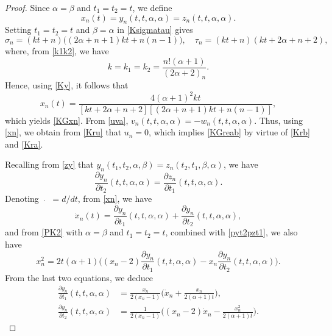 \documentclass[10pt, reqno]{amsart}
\numberwithin{equation}{section}
\numberwithin{equation}{section}
\begin{document}
\begin{proof}
Since $\alpha=\beta$ and $t_1=t_2=t$, we define
\begin{equation}
x_n(t)=y_n(t,t,\alpha,\alpha)=z_n(t,t,\alpha,\alpha).\label{xn}
\end{equation}
Setting $t_1=t_2=t$ and $\beta=\alpha $ in \eqref{Ksigmatau} gives
\begin{equation*}
\sigma_n=(kt+n)\big((2\alpha+n+1)kt+n(n-1)\big),\quad \tau_n=(kt+n)(kt+2\alpha+n+2),
\end{equation*}
where, from \eqref{k1k2}, we have
\begin{equation*}
k=k_1=k_2=\frac{n!(\alpha+1)}{(2\alpha+2)_n}.
\end{equation*}
Hence, using \eqref{Ky}, it follows that
\begin{equation*}
x_n(t)=\frac{4(\alpha+1)^2kt}{[kt+2\alpha+n+2][(2\alpha+n+1)kt+n(n-1)]},
\end{equation*}
which yields \eqref{KGxn}. From \eqref{uva}, $v_n(t,t,\alpha,\alpha)=-w_n(t,t,\alpha,\alpha)$. Thus, using \eqref{xn}, we obtain from \eqref{Kru} that $u_n=0$, which implies \eqref{KGreab} by virtue of \eqref{Krb} and \eqref{Kra}.

Recalling from \eqref{zy} that $y_n(t_1,t_2,\alpha,\beta)=z_n(t_2,t_1,\beta,\alpha)$, we have
\begin{equation} 
\frac{\partial y_n}{\partial t_2}(t,t,\alpha,\alpha)=\frac{\partial z_n}{\partial t_1}(t,t,\alpha,\alpha).\label{pyt2pzt1}
\end{equation}
Denoting $\dot{\quad}=d/dt$, from \eqref{xn}, we have 
\begin{equation*}
\dot{x}_n(t)=\frac{\partial y_n}{\partial t_1}(t,t,\alpha,\alpha)+\frac{\partial y_n}{\partial t_2}(t,t,\alpha,\alpha),
\end{equation*}
and from \eqref{PK2} with $\alpha=\beta$ and $t_1=t_2=t$, combined with \eqref{pyt2pzt1}, we also have
\begin{equation*}
x_n^2=2t(\alpha+1)\Big((x_n-2)\frac{\partial y_n}{\partial t_1}(t,t,\alpha,\alpha)-x_n\frac{\partial y_n}{\partial t_2}(t,t,\alpha,\alpha)\Big).
\end{equation*}
From the last two equations, we deduce 
\begin{align}
\frac{\partial y_n}{\partial t_1}(t,t,\alpha,\alpha)&=\frac{x_n}{2(x_n-1)}\Big(\dot{x}_n+\frac{x_n}{2(\alpha+1)t}\Big),\label{pyt1x}\\
\frac{\partial y_n}{\partial t_2}(t,t,\alpha,\alpha)&=\frac{1}{2(x_n-1)}\Big((x_n-2)\dot{x}_n-\frac{x_n^2}{2(\alpha+1)t}\Big)\label{pyt2x}.
\end{align}


\end{proof}
\end{document}

